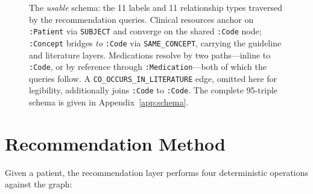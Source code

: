 \begin{figure}[htbp]
{}
\caption{The \emph{usable} schema: the 11 labels and 11 relationship types traversed by the
recommendation queries. Clinical resources anchor on \texttt{:Patient} via \texttt{SUBJECT}
and converge on the shared \texttt{:Code} node; \texttt{:Concept} bridges \emph{to}
\texttt{:Code} via \texttt{SAME\_CONCEPT}, carrying the guideline and literature layers.
Medications resolve by two paths---inline to \texttt{:Code}, or by reference through
\texttt{:Medication}---both of which the queries follow. A
\texttt{CO\_OCCURS\_IN\_LITERATURE} edge, omitted here for legibility, additionally joins
\texttt{:Code} to \texttt{:Code}. The complete 95-triple schema is given in
Appendix~\ref{app:schema}.}
\label{fig:graph-model}
\end{figure}

\section{Recommendation Method}
\label{sec:dss-method}

Given a patient, the recommendation layer performs four deterministic operations against
the graph:

